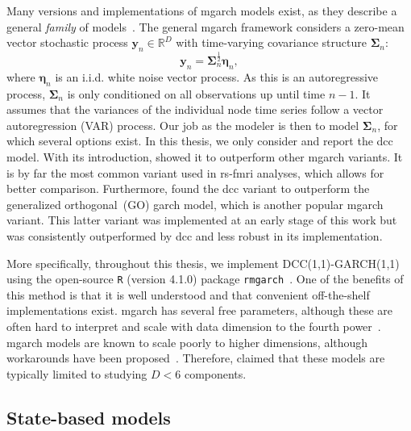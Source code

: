 Many versions and implementations of \gls{mgarch} models exist, as they describe a general \emph{family} of models~\parencite[see][for an extensive overview]{Silvennoinen2009}.
%
The general \gls{mgarch} framework considers a zero-mean vector stochastic process $\mathbf{y}_n \in \mathbb{R}^D$ with time-varying covariance structure $\mathbf{\Sigma}_n$:
\begin{equation}
  \mathbf{y}_n = \mathbf{\Sigma}_n^{\frac12} \mathbf{\eta}_n,
\end{equation}
where $\mathbf{\eta}_n$ is an i.i.d. white noise vector process.
As this is an autoregressive process, $\mathbf{\Sigma}_n$ is only conditioned on all observations up until time $n - 1$.
It assumes that the variances of the individual node time series follow a vector autoregression (VAR) process.
%
Our job as the modeler is then to model $\mathbf{\Sigma}_n$, for which several options exist.
In this thesis, we only consider and report the \gls{dcc} model.
With its introduction, \textcite{Engle2002} showed it to outperform other \gls{mgarch} variants.
It is by far the most common variant used in \gls{rs-fmri} analyses, which allows for better comparison.
Furthermore, \textcite{Heaukulani2019} found the \gls{dcc} variant to outperform the generalized orthogonal~(GO) \gls{garch} model, which is another popular \gls{mgarch} variant.
This latter variant was implemented at an early stage of this work but was consistently outperformed by \gls{dcc} and less robust in its implementation.

More specifically, throughout this thesis, we implement DCC(1,1)-GARCH(1,1) using the open-source \texttt{R} (version 4.1.0) package \texttt{rmgarch}~\parencite{Galanos2022}.
One of the benefits of this method is that it is well understood and that convenient off-the-shelf implementations exist.
\Gls{mgarch} has several free parameters, although these are often hard to interpret and scale with data dimension to the fourth power~\parencite{Silvennoinen2009}.
\Gls{mgarch} models are known to scale poorly to higher dimensions, although workarounds have been proposed~\parencite[see e.g.][]{Nakajima2017}.
Therefore, \textcite{Gourieroux2009} claimed that these models are typically limited to studying $D < 6$ components.

\subsection{State-based models}\label{subsec:state-based-models}

